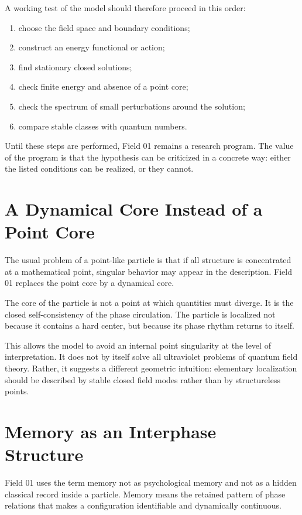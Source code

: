 \documentclass[11pt,a4paper]{article}
\begin{document}
A working test of the model should therefore proceed in this order:
\begin{enumerate}
\item choose the field space and boundary conditions;
\item construct an energy functional or action;
\item find stationary closed solutions;
\item check finite energy and absence of a point core;
\item check the spectrum of small perturbations around the solution;
\item compare stable classes with quantum numbers.
\end{enumerate}

Until these steps are performed, Field 01 remains a research program. The value of the program is that the hypothesis can be criticized in a concrete way: either the listed conditions can be realized, or they cannot.

\section{A Dynamical Core Instead of a Point Core}

The usual problem of a point-like particle is that if all structure is concentrated at a mathematical point, singular behavior may appear in the description. Field 01 replaces the point core by a dynamical core.

The core of the particle is not a point at which quantities must diverge. It is the closed self-consistency of the phase circulation. The particle is localized not because it contains a hard center, but because its phase rhythm returns to itself.

This allows the model to avoid an internal point singularity at the level of interpretation. It does not by itself solve all ultraviolet problems of quantum field theory. Rather, it suggests a different geometric intuition: elementary localization should be described by stable closed field modes rather than by structureless points.

\section{Memory as an Interphase Structure}

Field 01 uses the term memory not as psychological memory and not as a hidden classical record inside a particle. Memory means the retained pattern of phase relations that makes a configuration identifiable and dynamically continuous.
\end{document}
